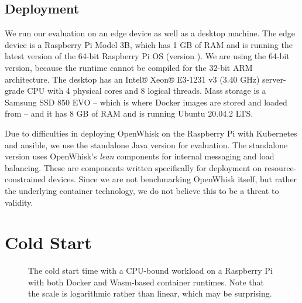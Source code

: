 \subsection{Deployment}

We run our evaluation on an edge device as well as a  desktop machine. The edge device is a Raspberry Pi Model 3B, which has 1 GB of RAM and is running the latest version of the 64-bit Raspberry Pi OS (version ). We are using the 64-bit version, because the  runtime cannot be compiled for the 32-bit ARM architecture. The desktop has an Intel® Xeon® E3-1231 v3 (3.40 GHz) server-grade CPU with 4 physical cores and 8 logical threads. Mass storage is a Samsung SSD 850 EVO -- which is where Docker images are stored and loaded from -- and it has 8 GB of RAM and is running Ubuntu 20.04.2 LTS.

Due to difficulties in deploying OpenWhisk on the Raspberry Pi with Kubernetes and ansible, we use the standalone Java version for evaluation. The standalone version uses OpenWhisk's \emph{lean} components for internal messaging and load balancing. These are components written specifically for deployment on resource-constrained devices. Since we are not benchmarking OpenWhisk itself, but rather the underlying container technology, we do not believe this to be a threat to validity.

\section{Cold Start}

\begin{figure}
    \begin{center}
        
    \end{center}
    \caption{The cold start time with a CPU-bound workload on a Raspberry Pi with both Docker and Wasm-based container runtimes. Note that the scale is logarithmic rather than linear, which may be surprising.}
    \label{fig:pi-cold-start-hash}
\end{figure}

